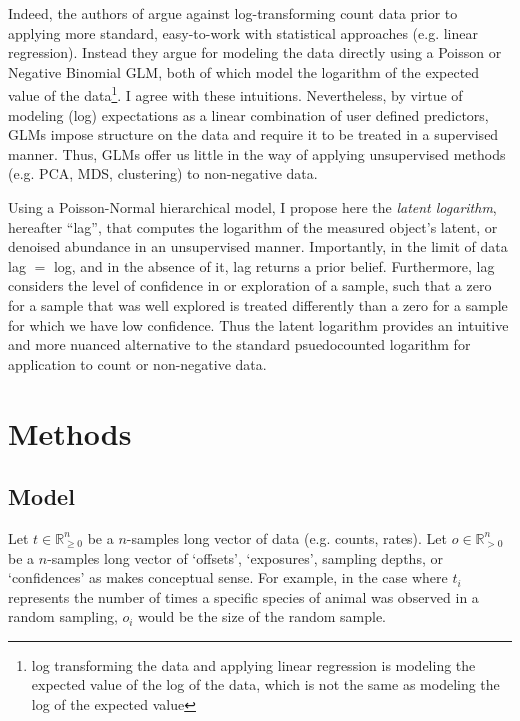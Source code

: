\documentclass[11pt]{article}
\begin{document}
Indeed, the authors of \cite{OHara2010} argue against log-transforming count data prior to applying more standard, easy-to-work with statistical approaches (e.g. linear regression). Instead they argue for modeling the data directly using a Poisson or Negative Binomial GLM, both of which model the logarithm of the expected value of the data\footnote[2]{log transforming the data and applying linear regression is modeling the expected value of the log of the data, which is not the same as modeling the log of the expected value}.  I agree with these intuitions. Nevertheless, by virtue of modeling (log) expectations as a linear combination of user defined predictors, GLMs impose structure on the data and require it to be treated in a supervised manner. Thus, GLMs offer us little in the way of applying unsupervised methods (e.g. PCA, MDS, clustering) to non-negative data.

Using a Poisson-Normal hierarchical model, I propose here the \emph{latent logarithm}, hereafter ``lag'', that computes the logarithm of the measured object's latent, or denoised abundance in an unsupervised manner. Importantly, in the limit of data lag $=$ log, and in the absence of it, lag returns a prior belief. Furthermore, lag considers the level of confidence in or exploration of a sample, such that a zero for a sample that was well explored is treated differently than a zero for a sample for which we have low confidence. Thus the latent logarithm provides an intuitive and more nuanced alternative to the standard psuedocounted logarithm for application to count or non-negative data.

\section{Methods}

\subsection{Model}
Let $t \in \mathbb{R}_{\geq 0}^n$ be a $n$-samples long vector of data (e.g. counts, rates). Let $o \in \mathbb{R}_{> 0}^n$ be a $n$-samples long vector of `offsets', `exposures', sampling depths, or `confidences' as makes conceptual sense. For example, in the case where $t_i$ represents the number of times a specific species of animal was observed in a random sampling, $o_i$ would be the size of the random sample. 
\end{document}
